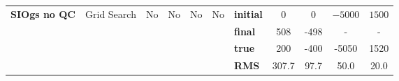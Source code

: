 \begin{table}
{\begin{tabular}{c | c c c c c | l c c c c}
\hline
\multirow{4}{*}{\textbf{SIOgs no QC}} & \multirow{4}{*}{Grid Search} & \multirow{4}{*}{No} & \multirow{4}{*}{No} & \multirow{4}{*}{No} & \multirow{4}{*}{No} & \textbf{initial} & 0 & 0 & $\mathit{-5000}$ & $\mathit{1500}$ \\ 
\multirow{4}{*}{} & \multirow{4}{*}{} & \multirow{4}{*}{} & \multirow{4}{*}{} & \multirow{4}{*}{} & \multirow{4}{*}{} & \textbf{final}& 508 & -498 & - & - \\ 
\multirow{4}{*}{} & \multirow{4}{*}{} & \multirow{4}{*}{} & \multirow{4}{*}{} & \multirow{4}{*}{} & \multirow{4}{*}{} & \textbf{true}& 200 & -400 & -5050 & 1520 \\ 
\multirow{4}{*}{} & \multirow{4}{*}{} & \multirow{4}{*}{} & \multirow{4}{*}{} & \multirow{4}{*}{} & \multirow{4}{*}{} & \textbf{RMS} & 307.7 & 97.7 & 50.0 & 20.0 \\ 
\hline
\end{tabular}
}
\label{table:compare_tool}
\end{table}
